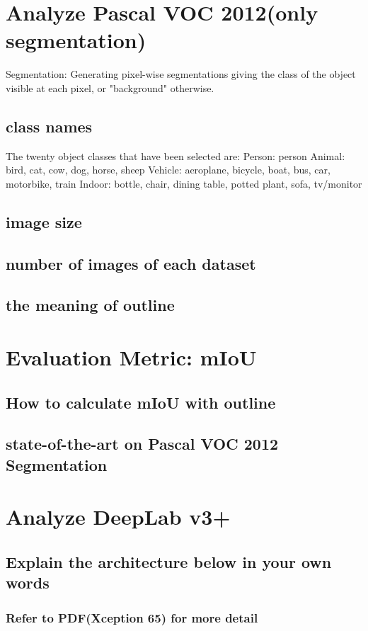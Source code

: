\documentclass{article}
\begin{document}
\pagestyle{fancy}

\section{Analyze Pascal VOC 2012(only segmentation)}
Segmentation: Generating pixel-wise segmentations giving the class of the object visible at each pixel, or "background" otherwise.
\subsection{class names}
The twenty object classes that have been selected are:
Person: person
Animal: bird, cat, cow, dog, horse, sheep
Vehicle: aeroplane, bicycle, boat, bus, car, motorbike, train
Indoor: bottle, chair, dining table, potted plant, sofa, tv/monitor
\subsection{image size}
\subsection{number of images of each dataset}
\subsection{the meaning of outline}
\section{Evaluation Metric: mIoU}
\subsection{How to calculate mIoU with outline}
\subsection{state-of-the-art on Pascal VOC 2012 Segmentation}
\section{Analyze DeepLab v3+}
\subsection{Explain the architecture below in your own words}
\subsubsection{Refer to PDF(Xception 65) for more detail}
\end{document}
